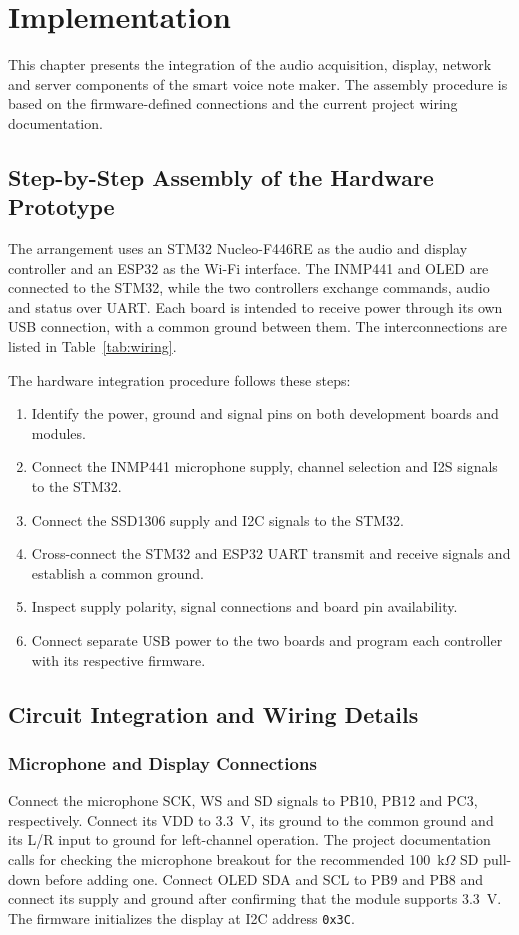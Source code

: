\documentclass[a4paper,12pt,oneside]{report}
\begin{document}
\chapter{Implementation}
\label{ch:implementation}

This chapter presents the integration of the audio acquisition, display, network and server components of the smart voice note maker. The assembly procedure is based on the firmware-defined connections and the current project wiring documentation.

\section{Step-by-Step Assembly of the Hardware Prototype}
The arrangement uses an STM32 Nucleo-F446RE as the audio and display controller and an ESP32 as the Wi-Fi interface. The INMP441 and OLED are connected to the STM32, while the two controllers exchange commands, audio and status over UART. Each board is intended to receive power through its own USB connection, with a common ground between them. The interconnections are listed in Table~\ref{tab:wiring}.

The hardware integration procedure follows these steps:
\begin{enumerate}
\item Identify the power, ground and signal pins on both development boards and modules.
\item Connect the INMP441 microphone supply, channel selection and I2S signals to the STM32.
\item Connect the SSD1306 supply and I2C signals to the STM32.
\item Cross-connect the STM32 and ESP32 UART transmit and receive signals and establish a common ground.
\item Inspect supply polarity, signal connections and board pin availability.
\item Connect separate USB power to the two boards and program each controller with its respective firmware.
\end{enumerate}

\section{Circuit Integration and Wiring Details}
\subsection{Microphone and Display Connections}
Connect the microphone SCK, WS and SD signals to PB10, PB12 and PC3, respectively. Connect its VDD to 3.3~V, its ground to the common ground and its L/R input to ground for left-channel operation. The project documentation calls for checking the microphone breakout for the recommended 100~k$\Omega$ SD pull-down before adding one. Connect OLED SDA and SCL to PB9 and PB8 and connect its supply and ground after confirming that the module supports 3.3~V. The firmware initializes the display at I2C address \texttt{0x3C}.
\end{document}
